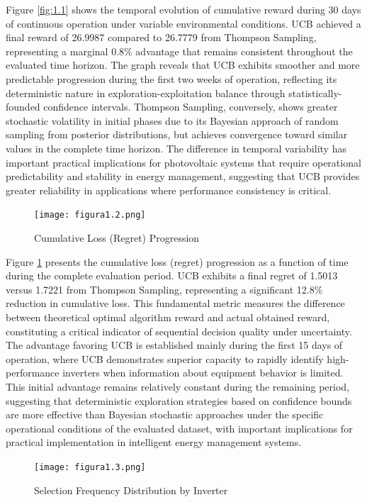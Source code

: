 \documentclass[conference]{IEEEtran}
\begin{document}
Figure \ref{fig:1.1} shows the temporal evolution of cumulative reward during 30 days of continuous operation under variable environmental conditions. UCB achieved a final reward of 26.9987 compared to 26.7779 from Thompson Sampling, representing a marginal 0.8\% advantage that remains consistent throughout the evaluated time horizon. The graph reveals that UCB exhibits smoother and more predictable progression during the first two weeks of operation, reflecting its deterministic nature in exploration-exploitation balance through statistically-founded confidence intervals. Thompson Sampling, conversely, shows greater stochastic volatility in initial phases due to its Bayesian approach of random sampling from posterior distributions, but achieves convergence toward similar values in the complete time horizon. The difference in temporal variability has important practical implications for photovoltaic systems that require operational predictability and stability in energy management, suggesting that UCB provides greater reliability in applications where performance consistency is critical.

\begin{figure}[H]
\centering
\texttt{[image: figura1.2.png]}
\caption{Cumulative Loss (Regret) Progression}
\label{fig:1.2}
\end{figure}

Figure \ref{fig:1.2} presents the cumulative loss (regret) progression as a function of time during the complete evaluation period. UCB exhibits a final regret of 1.5013 versus 1.7221 from Thompson Sampling, representing a significant 12.8\% reduction in cumulative loss. This fundamental metric measures the difference between theoretical optimal algorithm reward and actual obtained reward, constituting a critical indicator of sequential decision quality under uncertainty. The advantage favoring UCB is established mainly during the first 15 days of operation, where UCB demonstrates superior capacity to rapidly identify high-performance inverters when information about equipment behavior is limited. This initial advantage remains relatively constant during the remaining period, suggesting that deterministic exploration strategies based on confidence bounds are more effective than Bayesian stochastic approaches under the specific operational conditions of the evaluated dataset, with important implications for practical implementation in intelligent energy management systems.

\begin{figure}[H]
\centering
\texttt{[image: figura1.3.png]}
\caption{Selection Frequency Distribution by Inverter}
\label{fig:1.3}
\end{figure}
\end{document}
